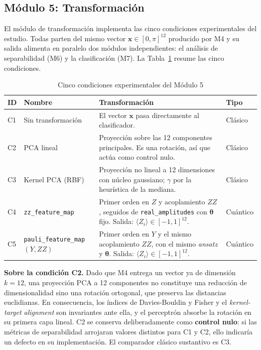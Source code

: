 
\subsection{Módulo 5: Transformación}
\label{sec:modulo5}

El módulo de transformación implementa las cinco condiciones experimentales del estudio. Todas
parten del mismo vector $\mathbf{x} \in [0,\pi]^{12}$ producido por M4 y su salida alimenta en
paralelo dos módulos independientes: el análisis de separabilidad (M6) y la clasificación (M7).
La Tabla~\ref{tab:condiciones} resume las cinco condiciones.

\begin{table}[H]
\centering
\caption{Cinco condiciones experimentales del Módulo 5}
\label{tab:condiciones}
\renewcommand{\arraystretch}{1.3}
\begin{tabularx}{\textwidth}{@{}llXl@{}}
\toprule
\textbf{ID} & \textbf{Nombre} &
\textbf{Transformación} & \textbf{Tipo} \\
\midrule
C1 & Sin transformación & El vector $\mathbf{x}$ pasa directamente al clasificador. & Clásico \\
C2 & PCA lineal & Proyección sobre las 12 componentes principales. Es una rotación,
     así que actúa como control nulo. & Clásico \\
C3 & Kernel PCA (RBF) & Proyección no lineal a 12 dimensiones con núcleo gaussiano;
     $\gamma$ por la heurística de la mediana. & Clásico \\
C4 & \texttt{zz\_feature\_map} & Primer orden en $Z$ y acoplamiento $ZZ$, seguidos de
     \texttt{real\_amplitudes} con $\boldsymbol\theta$ fijo. Salida:
     $\langle Z_i\rangle\in[-1,1]^{12}$. & Cuántico \\
C5 & \texttt{pauli\_feature\_map}$(Y, ZZ)$ & Primer orden en $Y$ y el mismo acoplamiento $ZZ$,
     con el mismo \textit{ansatz} y $\boldsymbol\theta$. Salida:
     $\langle Z_i\rangle\in[-1,1]^{12}$. & Cuántico \\
\bottomrule
\end{tabularx}
\end{table}

\textbf{Sobre la condición C2.} Dado que M4 entrega un vector ya de dimensión $k=12$, una
proyección PCA a 12 componentes no constituye una reducción de dimensionalidad sino una
rotación ortogonal, que preserva las distancias euclidianas. En consecuencia, los índices
de Davies-Bouldin y Fisher y el \textit{kernel-target alignment} son invariantes ante ella,
y el perceptrón absorbe la rotación en su primera capa lineal. C2 se conserva
deliberadamente como \textbf{control nulo}: si las métricas de separabilidad arrojaran
valores distintos para C1 y C2, ello indicaría un defecto en su implementación. El
comparador clásico sustantivo es C3.

